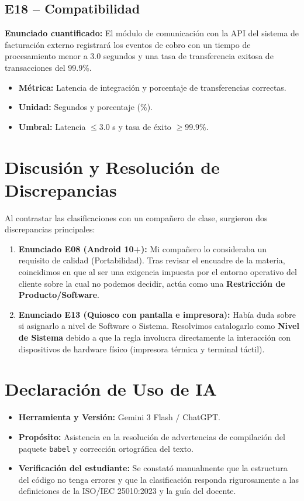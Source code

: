 \documentclass[11pt, a4paper]{article}
\begin{document}
\subsection{E18 -- Compatibilidad}
\textbf{Enunciado cuantificado:} El m\'odulo de comunicaci\'on con la API del sistema de facturaci\'on externo registrar\'a los eventos de cobro con un tiempo de procesamiento menor a 3.0 segundos y una tasa de transferencia exitosa de transacciones del 99.9\%.
\begin{itemize}
    \item \textbf{M\'etrica:} Latencia de integraci\'on y porcentaje de transferencias correctas.
    \item \textbf{Unidad:} Segundos y porcentaje (\%).
    \item \textbf{Umbral:} Latencia $\le 3.0$ s y tasa de \'exito $\ge 99.9\%$.
\end{itemize}

\section{Discusi\'on y Resoluci\'on de Discrepancias}
Al contrastar las clasificaciones con un compa\~nero de clase, surgieron dos discrepancias principales:
\begin{enumerate}
    \item \textbf{Enunciado E08 (Android 10+):} Mi compa\~nero lo consideraba un requisito de calidad (Portabilidad). Tras revisar el encuadre de la materia, coincidimos en que al ser una exigencia impuesta por el entorno operativo del cliente sobre la cual no podemos decidir, act\'ua como una \textbf{Restricci\'on de Producto/Software}.
    \item \textbf{Enunciado E13 (Quiosco con pantalla e impresora):} Hab\'ia duda sobre si asignarlo a nivel de Software o Sistema. Resolvimos catalogarlo como \textbf{Nivel de Sistema} debido a que la regla involucra directamente la interacci\'on con dispositivos de hardware f\'isico (impresora t\'ermica y terminal t\'actil).
\end{enumerate}

\section{Declaraci\'on de Uso de IA}
\begin{itemize}
    \item \textbf{Herramienta y Versi\'on:} Gemini 3 Flash / ChatGPT.
    \item \textbf{Prop\'osito:} Asistencia en la resoluci\'on de advertencias de compilaci\'on del paquete \texttt{babel} y correcci\'on ortogr\'afica del texto.
    \item \textbf{Verificaci\'on del estudiante:} Se constat\'o manualmente que la estructura del c\'odigo no tenga errores y que la clasificaci\'on responda rigurosamente a las definiciones de la ISO/IEC 25010:2023 \cite{iso25010} y la gu\'ia del docente.
\end{itemize}
\end{document}
